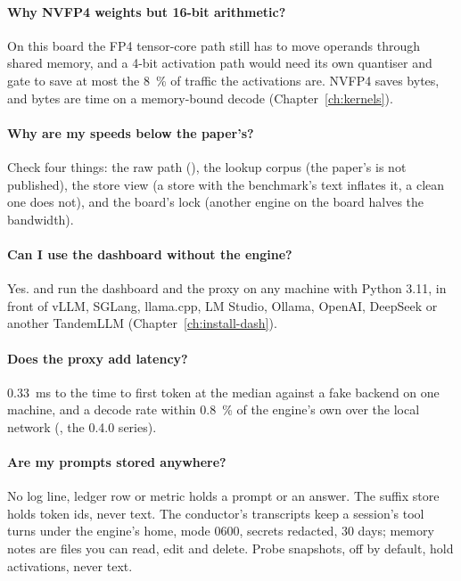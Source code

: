 \paragraph{Why NVFP4 weights but 16-bit arithmetic?} On this board the FP4 tensor-core path still has to move operands through shared memory, and a 4-bit activation path would need its own quantiser and gate to save at most the 8~\% of traffic the activations are. NVFP4 saves bytes, and bytes are time on a memory-bound decode (Chapter~\ref{ch:kernels}).

\paragraph{Why are my speeds below the paper's?} Check four things: the raw path (), the lookup corpus (the paper's is not published), the store view (a store with the benchmark's text inflates it, a clean one does not), and the board's lock (another engine on the board halves the bandwidth).

\paragraph{Can I use the dashboard without the engine?} Yes.  and  run the dashboard and the proxy on any machine with Python 3.11, in front of vLLM, SGLang, llama.cpp, LM Studio, Ollama, OpenAI, DeepSeek or another TandemLLM (Chapter~\ref{ch:install-dash}).

\paragraph{Does the proxy add latency?} 0.33~ms to the time to first token at the median against a fake backend on one machine, and a decode rate within 0.8~\% of the engine's own over the local network (\measured, the 0.4.0 series).

\paragraph{Are my prompts stored anywhere?} No log line, ledger row or metric holds a prompt or an answer. The suffix store holds token ids, never text. The conductor's transcripts keep a session's tool turns under the engine's home, mode 0600, secrets redacted, 30 days; memory notes are files you can read, edit and delete. Probe snapshots, off by default, hold activations, never text.


